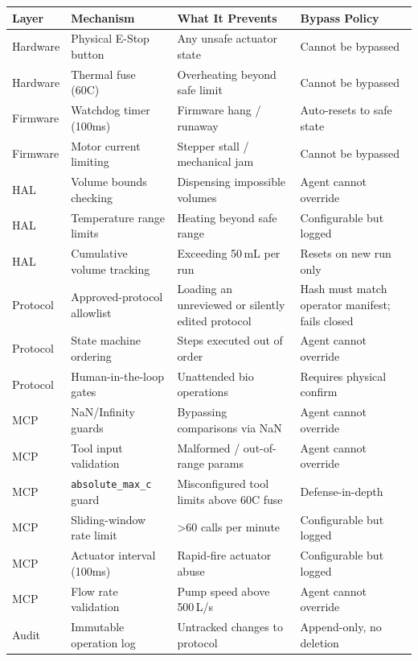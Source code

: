 \documentclass[11pt,letterpaper]{article}
\begin{document}
\begin{xltabular}{\textwidth}{L{1.8cm} L{4.2cm} Y L{3.6cm}}
\toprule
\textbf{Layer} & \textbf{Mechanism} & \textbf{What It Prevents} & \textbf{Bypass Policy} \\
\midrule
\endhead
Hardware & Physical E-Stop button & Any unsafe actuator state & Cannot be bypassed \\
Hardware & Thermal fuse (60\textdegree{}C) & Overheating beyond safe limit & Cannot be bypassed \\
Firmware & Watchdog timer (100ms) & Firmware hang / runaway & Auto-resets to safe state \\
Firmware & Motor current limiting & Stepper stall / mechanical jam & Cannot be bypassed \\
HAL & Volume bounds checking & Dispensing impossible volumes & Agent cannot override \\
HAL & Temperature range limits & Heating beyond safe range & Configurable but logged \\
HAL & Cumulative volume tracking & Exceeding 50\,mL per run & Resets on new run only \\
Protocol & Approved-protocol allowlist & Loading an unreviewed or silently edited protocol & Hash must match operator manifest; fails closed \\
Protocol & State machine ordering & Steps executed out of order & Agent cannot override \\
Protocol & Human-in-the-loop gates & Unattended bio operations & Requires physical confirm \\
MCP & NaN/Infinity guards & Bypassing comparisons via NaN & Agent cannot override \\
MCP & Tool input validation & Malformed / out-of-range params & Agent cannot override \\
MCP & \texttt{absolute\_max\_c} guard & Misconfigured tool limits above 60\textdegree{}C fuse & Defense-in-depth \\
MCP & Sliding-window rate limit & >60 calls per minute & Configurable but logged \\
MCP & Actuator interval (100ms) & Rapid-fire actuator abuse & Configurable but logged \\
MCP & Flow rate validation & Pump speed above 500\,\textmu{}L/s & Agent cannot override \\
Audit & Immutable operation log & Untracked changes to protocol & Append-only, no deletion \\*
\bottomrule
\end{xltabular}
\end{document}
